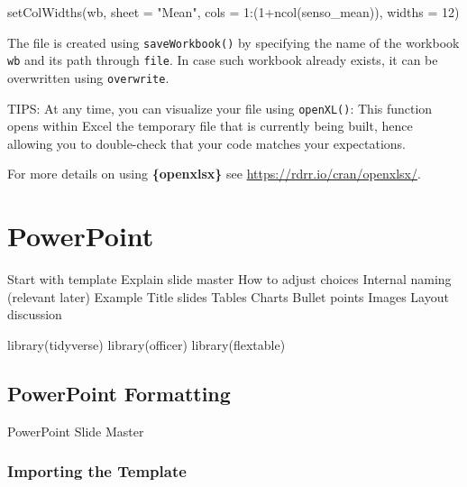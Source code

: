 \documentclass[
]{book}
\newenvironment{Shaded}{\begin{snugshade}}{\end{snugshade}}
\newcommand{\AttributeTok}[1]{\textcolor[rgb]{0.77,0.63,0.00}{#1}}
\newcommand{\DecValTok}[1]{\textcolor[rgb]{0.00,0.00,0.81}{#1}}
\newcommand{\FunctionTok}[1]{\textcolor[rgb]{0.00,0.00,0.00}{#1}}
\newcommand{\NormalTok}[1]{#1}
\newcommand{\SpecialCharTok}[1]{\textcolor[rgb]{0.00,0.00,0.00}{#1}}
\newcommand{\StringTok}[1]{\textcolor[rgb]{0.31,0.60,0.02}{#1}}
\begin{document}
\begin{Shaded}
\begin{Highlighting}[]
\FunctionTok{setColWidths}\NormalTok{(wb, }\AttributeTok{sheet =} \StringTok{"Mean"}\NormalTok{,}
             \AttributeTok{cols =} \DecValTok{1}\SpecialCharTok{:}\NormalTok{(}\DecValTok{1}\SpecialCharTok{+}\FunctionTok{ncol}\NormalTok{(senso\_mean)), }\AttributeTok{widths =} \DecValTok{12}\NormalTok{)}
\end{Highlighting}
\end{Shaded}

The file is created using \texttt{saveWorkbook()} by specifying the name of the workbook \texttt{wb} and its path through \texttt{file}. In case such workbook already exists, it can be overwritten using \texttt{overwrite}.

TIPS: At any time, you can visualize your file using \texttt{openXL()}: This function opens within Excel the temporary file that is currently being built, hence allowing you to double-check that your code matches your expectations.

For more details on using \textbf{\{openxlsx\}} see \url{https://rdrr.io/cran/openxlsx/}.

\hypertarget{powerpoint}{%
\section{PowerPoint}\label{powerpoint}}

Start with template
Explain slide master
How to adjust choices
Internal naming (relevant later)
Example
Title slides
Tables
Charts
Bullet points
Images
Layout discussion

\begin{Shaded}
\begin{Highlighting}[]
\FunctionTok{library}\NormalTok{(tidyverse)}
\FunctionTok{library}\NormalTok{(officer)}
\FunctionTok{library}\NormalTok{(flextable)}
\end{Highlighting}
\end{Shaded}

\hypertarget{powerpoint-formatting}{%
\subsection{PowerPoint Formatting}\label{powerpoint-formatting}}

PowerPoint Slide Master

\hypertarget{importing-the-template}{%
\subsubsection{Importing the Template}\label{importing-the-template}}
\end{document}
